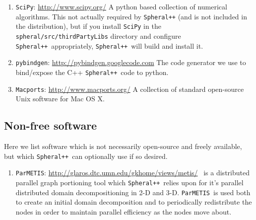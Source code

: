 \documentclass{article}
\newcommand{\Spheral}{{\tt Spheral++}}
\begin{document}
\begin{enumerate}
\item \verb+SciPy+: \url{http://www.scipy.org/} \newline A python based
  collection of numerical algorithms.  This not actually required by \Spheral
  (and is not included in the distribution), but if you install {\tt SciPy} in
  the \verb+spheral/src/thirdPartyLibs+ directory and configure
  \Spheral\ appropriately, \Spheral\ will build and install it.

\item \verb+pybindgen+: \url{http://pybindgen.googlecode.com} \newline
  The code generator we use to bind/expose the C++ \Spheral\ code to python.

\item\verb+Macports+: \url{http://www.macports.org/} \newline
\label{Macports.sec}
A collection of standard open-source Unix software for Mac OS X.

\end{enumerate}

\subsection{Non-free software}
\label{nonfree.sec}
Here we list software which is not necessarily open-source and freely available,
but which \Spheral\ can optionally use if so desired.
\newcommand{\Parmetis}{{\tt ParMETIS}}
\begin{enumerate}
\item \Parmetis: \label{parmetis.item}
  \url{http://glaros.dtc.umn.edu/gkhome/views/metis/} \newline \Parmetis\ is a
  distributed parallel graph portioning tool which \Spheral\ relies upon for
  it's parallel distributed domain decompositioning in 2-D and 3-D.
  \Parmetis\ is used both to create an initial domain decomposition and to
  periodically redistribute the nodes in order to maintain parallel efficiency
  as the nodes move about.
\end{enumerate}
\end{document}
